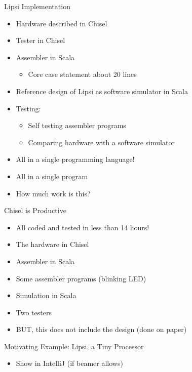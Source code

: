 \begin{frame}[fragile]{Lipsi Implementation}
\begin{itemize}
\item Hardware described in Chisel
\item Tester in Chisel
\item Assembler in Scala
\begin{itemize}
\item Core case statement about 20 lines
\end{itemize}
\item Reference design of Lipsi as software simulator in Scala
\item Testing:
\begin{itemize}
\item Self testing assembler programs
\item Comparing hardware with a software simulator
\end{itemize}
\item All in a single programming language!
\item All in a single program
\item How much work is this?
\end{itemize}
\end{frame}

\begin{frame}[fragile]{Chisel is Productive}
\begin{itemize}
\item All coded and tested in less than 14 hours!
\end{itemize}
\begin{itemize}
\item The hardware in Chisel
\item Assembler in Scala
\item Some assembler programs (blinking LED)
\item Simulation in Scala
\item Two testers
\end{itemize}
\begin{itemize}
\item BUT, this does not include the design (done on paper)
\end{itemize}
\end{frame}

\begin{frame}[fragile]{Motivating Example: Lipsi, a Tiny Processor}
\begin{itemize}
\item Show in IntelliJ (if beamer allows)
\end{itemize}
\end{frame}

